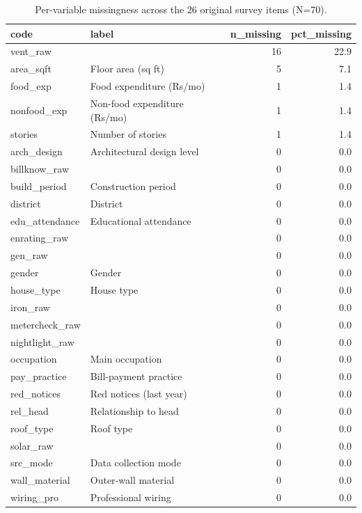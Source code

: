 \begin{table}
\caption{Per-variable missingness across the 26 original survey items (N=70).}
\label{tab:missingness}
\begin{tabular}{llrr}
\toprule
code & label & n\_missing & pct\_missing \\
\midrule
vent\_raw &  & 16 & 22.9 \\
area\_sqft & Floor area (sq ft) & 5 & 7.1 \\
food\_exp & Food expenditure (Rs/mo) & 1 & 1.4 \\
nonfood\_exp & Non-food expenditure (Rs/mo) & 1 & 1.4 \\
stories & Number of stories & 1 & 1.4 \\
arch\_design & Architectural design level & 0 & 0.0 \\
billknow\_raw &  & 0 & 0.0 \\
build\_period & Construction period & 0 & 0.0 \\
district & District & 0 & 0.0 \\
edu\_attendance & Educational attendance & 0 & 0.0 \\
enrating\_raw &  & 0 & 0.0 \\
gen\_raw &  & 0 & 0.0 \\
gender & Gender & 0 & 0.0 \\
house\_type & House type & 0 & 0.0 \\
iron\_raw &  & 0 & 0.0 \\
metercheck\_raw &  & 0 & 0.0 \\
nightlight\_raw &  & 0 & 0.0 \\
occupation & Main occupation & 0 & 0.0 \\
pay\_practice & Bill-payment practice & 0 & 0.0 \\
red\_notices & Red notices (last year) & 0 & 0.0 \\
rel\_head & Relationship to head & 0 & 0.0 \\
roof\_type & Roof type & 0 & 0.0 \\
solar\_raw &  & 0 & 0.0 \\
src\_mode & Data collection mode & 0 & 0.0 \\
wall\_material & Outer-wall material & 0 & 0.0 \\
wiring\_pro & Professional wiring & 0 & 0.0 \\
\bottomrule
\end{tabular}
\end{table}
